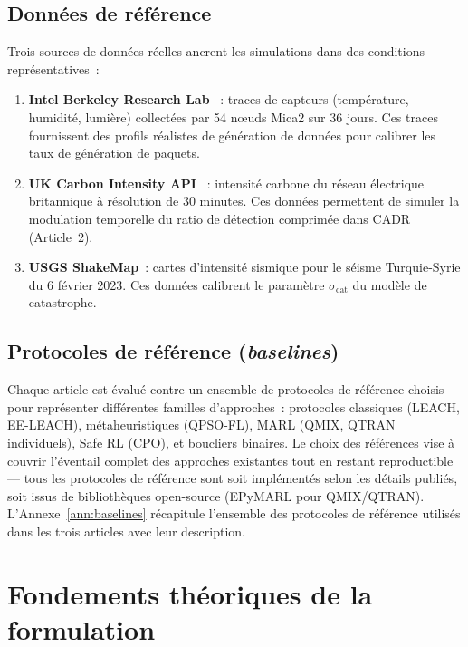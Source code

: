 \subsection{Données de référence}

Trois sources de données réelles ancrent les simulations dans des conditions représentatives~:
\begin{enumerate}
    \item \textbf{Intel Berkeley Research Lab} \cite{intel_lab_data}~: traces de capteurs (température, humidité, lumière) collectées par 54 n\oe{}uds Mica2 sur 36 jours. Ces traces fournissent des profils réalistes de génération de données pour calibrer les taux de génération de paquets.
    \item \textbf{UK Carbon Intensity API} \cite{uk_carbon_api}~: intensité carbone du réseau électrique britannique à résolution de 30 minutes. Ces données permettent de simuler la modulation temporelle du ratio de détection comprimée dans CADR (Article~2).
    \item \textbf{USGS ShakeMap}~: cartes d'intensité sismique pour le séisme Turquie-Syrie du 6 février 2023. Ces données calibrent le paramètre $\sigma_{\text{cat}}$ du modèle de catastrophe.
\end{enumerate}

\subsection{Protocoles de référence (\emph{baselines})}

Chaque article est évalué contre un ensemble de protocoles de référence choisis pour représenter différentes familles d'approches~: protocoles classiques (LEACH, EE-LEACH), métaheuristiques (QPSO-FL), MARL (QMIX, QTRAN individuels), Safe RL (CPO), et boucliers binaires. Le choix des références vise à couvrir l'éventail complet des approches existantes tout en restant reproductible --- tous les protocoles de référence sont soit implémentés selon les détails publiés, soit issus de bibliothèques open-source (EPyMARL pour QMIX/QTRAN). L'Annexe~\ref{ann:baselines} récapitule l'ensemble des protocoles de référence utilisés dans les trois articles avec leur description.


\section{Fondements théoriques de la formulation}\label{sec:demarche-theoretical}

